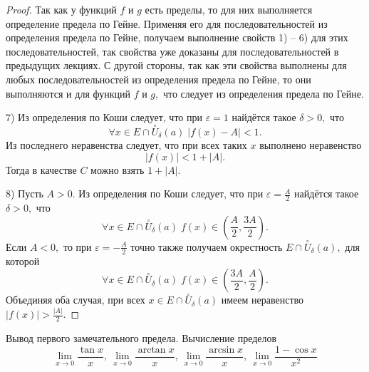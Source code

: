 \begin{proof}
    Так как у функций $f$ и $g$ есть пределы,
    то для них выполняется определение предела по
    Гейне. Применяя его для последовательностей
    из определения предела по Гейне,
    получаем выполнение свойств 1) -- 6) для этих
    последовательностей, так
    свойства уже доказаны для последовательностей в
    предыдущих лекциях. С другой стороны, так как
    эти свойства выполнены для любых последовательностей
    из определения предела по Гейне, то они выполняются
    и для функций $f$ и $g,$ что следует из
    определения предела по Гейне.

    7) Из определения по Коши следует, что
    при $\varepsilon=1$ найдётся такое $\delta>0,$
    что $$\forall x\in
        E\cap\stackrel{\circ}{U}_{\delta}(a)\;|f(x)-A|<1.$$
    Из последнего неравенства следует, что
    при всех таких $x$ выполнено неравенство
    $$|f(x)|<1+|A|.$$ Тогда в качестве $C$
    можно взять $1+|A|.$

    8) Пусть $A>0.$ Из определения по Коши следует, что
    при $\varepsilon=\frac{A}{2}$
    найдётся такое $\delta>0,$
    что $$\forall x\in
        E\cap\stackrel{\circ}{U}_{\delta}(a)\;
        f(x)\in\left(\frac{A}{2}, \frac{3A}{2}\right).$$
    Если $A<0,$ то при $\varepsilon=-\frac{A}{2}$
    точно также получаем окрестность
    $E\cap\stackrel{\circ}{U}_{\delta}(a),$ для которой
    $$\forall x\in
        E\cap\stackrel{\circ}{U}_{\delta}(a)\;
        f(x)\in\left(\frac{3A}{2}, \frac{A}{2}\right).$$
    Объединяя оба случая,
    при всех $x\in E\cap\stackrel{\circ}{U}_{\delta}(a)$
    имеем неравенство
    $|f(x)|>\frac{|A|}{2}.$
\end{proof}

\newpage
\begin{problem}
Вывод первого замечательного предела. Вычисление пределов
\begin{equation}
    \lim_{x\to0} \frac{\tan x}{x},\:\lim_{x\to0} \frac{\arctan x}{x},\:\lim_{x\to0} \frac{\arcsin x}{x},\:\lim_{x\to0} \frac{1-\cos x}{x^2}
\end{equation}
\end{problem}

